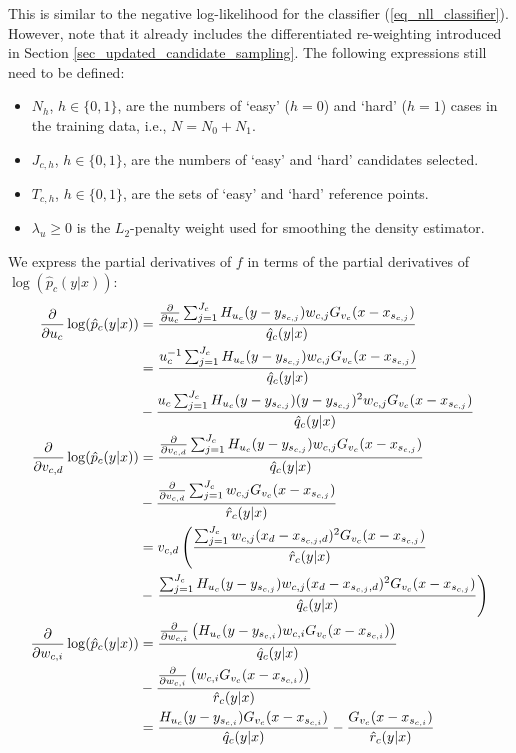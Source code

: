 %
This is similar to the negative log-likelihood for the classifier (\ref{eq_nll_classifier}).
However, note that it already includes the differentiated re-weighting introduced in Section \ref{sec_updated_candidate_sampling}.
The following expressions still need to be defined:
%
\begin{itemize}
\item $N_h$, $h\in\{0,1\}$, are the numbers of `easy' ($h=0$) and `hard' ($h=1$) cases in the training data, i.e., $N=N_0+N_1$.
%
\item $J_{c,h}$, $h\in\{0,1\}$, are the numbers of `easy' and `hard' candidates selected.
%
\item $T_{c,h}$, $h\in\{0,1\}$, are the sets of `easy' and `hard' reference points.
%
\item $\lambda_u\geq0$ is the $L_2$-penalty weight used for smoothing the density estimator.
\end{itemize}
%
We express the partial derivatives of $f$ in terms of the partial derivatives of $\log(\hat{p}_c(y|x))$:
%
\begin{align}
\frac{\partial}{\partial u_c}\log(\hat{p}_c(y|x))&=\frac{
\frac{\partial}{\partial u_c}\sum_{j=1}^{J_c}H_{u_c}(y-y_{s_{c,j}})w_{c,j}G_{v_c}(x-x_{s_{c,j}})
}{\hat{q}_c(y|x)}\label{p_partial_u_reg}\\
&=\frac{
u_c^{-1}\sum_{j=1}^{J_c}H_{u_c}(y-y_{s_{c,j}})w_{c,j}G_{v_c}(x-x_{s_{c,j}})
}{\hat{q}_c(y|x)}\notag\\
&-\frac{
u_c\sum_{j=1}^{J_c}H_{u_c}(y-y_{s_{c,j}})(y-y_{s_{c,j}})^2w_{c,j}G_{v_c}(x-x_{s_{c,j}})
}{\hat{q}_c(y|x)}\notag\\
\frac{\partial}{\partial v_{c,d}}\log(\hat{p}_c(y|x))&=\frac{
\frac{\partial}{\partial v_{c,d}}\sum_{j=1}^{J_c}H_{u_c}(y-y_{s_{c,j}})w_{c,j}G_{v_c}(x-x_{s_{c,j}})
}{\hat{q}_c(y|x)}\label{p_partial_v_reg}\\
&-\frac{\frac{\partial}{\partial v_{c,d}}\sum_{j=1}^{J_c}w_{c,j}G_{v_c}(x-x_{s_{c,j}})
}{\hat{r}_c(y|x)}\notag\\
&=v_{c,d}\left(\frac{
\sum_{j=1}^{J_c}w_{c,j}(x_d-x_{s_{c,j},d})^2G_{v_c}(x-x_{s_{c,j}})
}{\hat{r}_c(y|x)}\right.\notag\\
&-\left.\frac{
\sum_{j=1}^{J_c}H_{u_c}(y-y_{s_{c,j}})w_{c,j}(x_d-x_{s_{c,j},d})^2G_{v_c}(x-x_{s_{c,j}})
}{\hat{q}_c(y|x)}\right)\notag\\
\frac{\partial}{\partial w_{c,i}}\log(\hat{p}_c(y|x))&=\frac{
\frac{\partial}{\partial w_{c,i}}\left(H_{u_c}(y-y_{s_{c,i}})w_{c,i}G_{v_c}(x-x_{s_{c,i}})\right)
}{\hat{q}_c(y|x)}\label{p_partial_v_reg}\\
&-\frac{\frac{\partial}{\partial w_{c,i}}\left(w_{c,i}G_{v_c}(x-x_{s_{c,i}})\right)
}{\hat{r}_c(y|x)}\notag\\
&=\frac{H_{u_c}(y-y_{s_{c,i}})G_{v_c}(x-x_{s_{c,i}})}{\hat{q}_c(y|x)}
-\frac{G_{v_c}(x-x_{s_{c,i}})}{\hat{r}_c(y|x)}\notag
\end{align}
